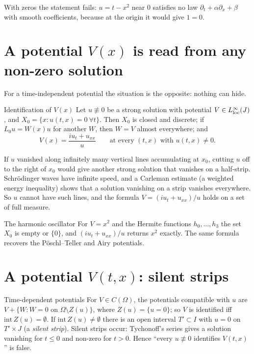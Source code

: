 \begin{caution}[title=Zeros matter]
With zeros the statement fails: $u=t-x^2$ near $0$ satisfies no law $\partial_t+\alpha\partial_x+\beta$ with smooth coefficients, because at the origin it would give $1=0$.
\end{caution}

\section{A potential $V(x)$ is read from any non-zero solution}

For a time-independent potential the situation is the opposite: nothing can hide.

\begin{theorem}{Identification of $V(x)$  \proved}\label{thm:vart1b}
Let $u\not\equiv0$ be a strong solution with potential $V\in L^\infty_{\rm loc}(J)$, and $X_0=\{x:u(t,x)=0\ \forall t\}$. Then $X_0$ is closed and discrete; if $L_0u=W(x)u$ for another $W$, then $W=V$ almost everywhere; and
\[
V(x)=\frac{iu_t+u_{xx}}{u}\qquad\text{at every }(t,x)\text{ with }u(t,x)\ne0 .
\]
\end{theorem}

\begin{intuition}
If $u$ vanished along infinitely many vertical lines accumulating at $x_0$, cutting $u$ off to the right of $x_0$ would give another strong solution that vanishes on a half-strip. Schr\"odinger waves have infinite speed, and a Carleman estimate (a weighted energy inequality) shows that a solution vanishing on a strip vanishes everywhere. So $u$ cannot have such lines, and the formula $V=(iu_t+u_{xx})/u$ holds on a set of full measure.
\end{intuition}

\begin{example}{The harmonic oscillator}
For $V=x^2$ and the Hermite functions $h_0,\dots,h_3$ the set $X_0$ is empty or $\{0\}$, and $(iu_t+u_{xx})/u$ returns $x^2$ exactly. The same formula recovers the P\"oschl--Teller and Airy potentials.
\end{example}

\section{A potential $V(t,x)$: silent strips}

\begin{theorem}{Time-dependent potentials  \proved}\label{thm:vart1c}
For $V\in C(\Omega)$, the potentials compatible with $u$ are $V+\{W:W=0\text{ on }\Omega\setminus Z(u)\}$, where $Z(u)=\{u=0\}$; so $V$ is identified iff $\mathrm{int}\,Z(u)=\emptyset$. If $\mathrm{int}\,Z(u)\ne\emptyset$ there is an open interval $T'\subset I$ with $u=0$ on $T'\times J$ (a \emph{silent strip}). Silent strips occur: Tychonoff's series gives a solution vanishing for $t\le0$ and non-zero for $t>0$. Hence ``every $u\not\equiv0$ identifies $V(t,x)$'' is false.
\end{theorem}

